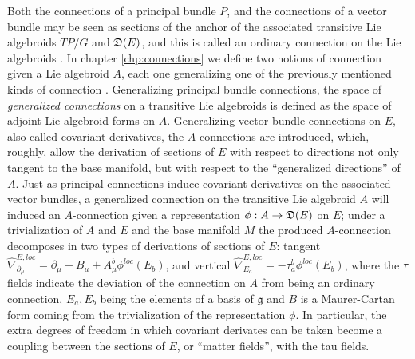 Both the connections of a principal bundle $P$, and the connections of a vector bundle may be seen as sections of the anchor of the associated transitive Lie algebroids $TP/G$ and $\mathfrak{D}(E)$, and this is called an ordinary connection on the Lie algebroids \cite{Mackenzie2005}. In chapter \ref{chp:connections} we define two notions of connection given a Lie algebroid $A$, each one generalizing one of the previously mentioned kinds of connection \cite{Lazzarini2012}. Generalizing principal bundle connections, the space of \textit{generalized connections} on a transitive Lie algebroids is defined as the space of adjoint Lie algebroid-forms on $A$. Generalizing vector bundle connections on $E$, also called covariant derivatives, the $A$-connections are introduced, which, roughly, allow the derivation of sections of $E$ with respect to directions not only tangent to the base manifold, but with respect to the ``generalized directions'' of $A$. Just as principal connections induce covariant derivatives on the associated vector bundles, a generalized connection on the transitive Lie algebroid $A$ will induced an $A$-connection given a representation $\phi:A \to \alg D(E)$ on $E$; under a trivialization of $A$ and $E$ and the base manifold $M$ the produced $A$-connection decomposes in two types of derivations of sections of $E$: tangent $\hat \nabla^{E, loc}_{\partial_\mu} = \partial_\mu + B_\mu + A^b_\mu \phi^{loc}(E_b)$, and vertical $\hat \nabla^{E, loc}_{E_a} = - \tau^b_a \phi^{loc} (E_b)$, where the $\tau$ fields indicate the deviation of the connection on $A$ from being an ordinary connection, $E_a, E_b$ being the elements of a basis of $\mathfrak g$ and $B$ is a Maurer-Cartan form coming from the trivialization of the representation $\phi$. In particular, the extra degrees of freedom in which covariant derivates can be taken become a coupling between the sections of $E$, or ``matter fields'', with the tau fields. 

